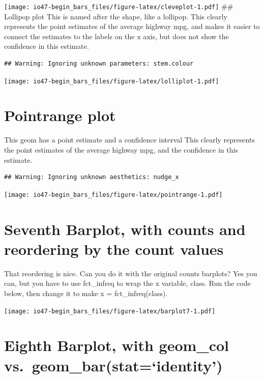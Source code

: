 \documentclass[
]{book}
\begin{document}
\texttt{[image: io47-begin\_bars\_files/figure-latex/cleveplot-1.pdf]}
\#\# Lollipop plot
This is named after the shape, like a lollipop.
This clearly represents the point estimates of the average highway mpg, and makes it easier to connect the estimates to the labels on the x axis, but does not show the confidence in this estimate.

\begin{verbatim}
## Warning: Ignoring unknown parameters: stem.colour
\end{verbatim}

\texttt{[image: io47-begin\_bars\_files/figure-latex/lolliplot-1.pdf]}

\hypertarget{pointrange-plot}{%
\section{Pointrange plot}\label{pointrange-plot}}

This geom has a point estimate and a confidence interval
This clearly represents the point estimates of the average highway mpg, and the confidence in this estimate.

\begin{verbatim}
## Warning: Ignoring unknown aesthetics: nudge_x
\end{verbatim}

\texttt{[image: io47-begin\_bars\_files/figure-latex/pointrange-1.pdf]}

\hypertarget{seventh-barplot-with-counts-and-reordering-by-the-count-values}{%
\section{Seventh Barplot, with counts and reordering by the count values}\label{seventh-barplot-with-counts-and-reordering-by-the-count-values}}

That reordering is nice. Can you do it with the original counts barplots? Yes you can, but you have to use fct\_infreq to wrap the x variable, class. Run the code below, then change it to make x = fct\_infreq(class).

\texttt{[image: io47-begin\_bars\_files/figure-latex/barplot7-1.pdf]}

\hypertarget{eighth-barplot-with-geom_col-vs.-geom_barstatidentity}{%
\section{Eighth Barplot, with geom\_col vs.~geom\_bar(stat=`identity')}\label{eighth-barplot-with-geom_col-vs.-geom_barstatidentity}}
\end{document}
